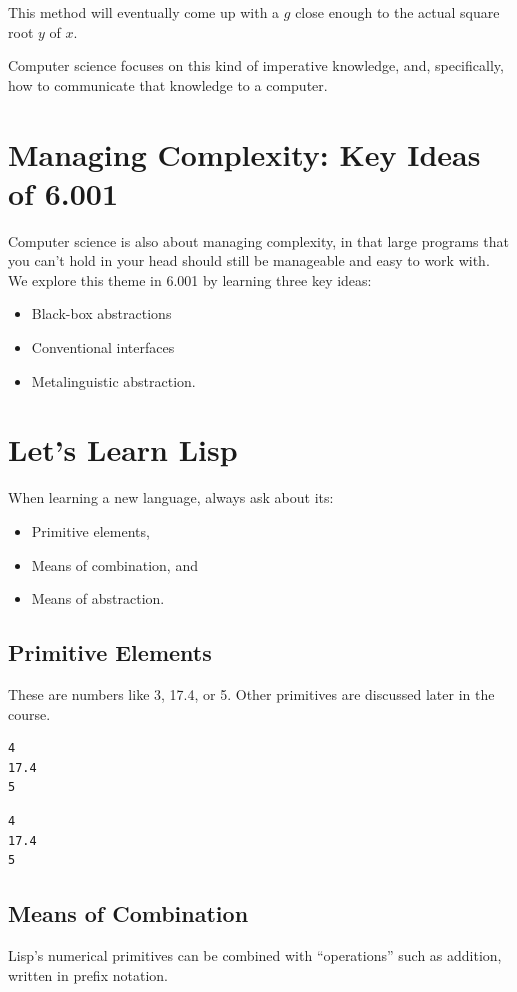\documentclass[9pt]{report}
\begin{document}
This method will eventually come up with a \(g\) close enough to the
actual square root \(y\) of \(x\).

Computer science focuses on this kind of imperative knowledge, and,
specifically, how to communicate that knowledge to a computer.

\section{Managing Complexity: Key Ideas of 6.001}
\label{sec:org9382d74}
Computer science is also about managing complexity, in that large
programs that you can't hold in your head should still be manageable
and easy to work with. We explore this theme in 6.001 by learning
three key ideas:

\begin{itemize}
\item Black-box abstractions
\item Conventional interfaces
\item Metalinguistic abstraction.
\end{itemize}


\section{Let's Learn Lisp}
\label{sec:orge65895a}
When learning a new language, always ask about its:
\begin{itemize}
\item Primitive elements,
\item Means of combination, and
\item Means of abstraction.
\end{itemize}

\subsection{Primitive Elements}
\label{sec:org0e97585}
These are numbers like 3, 17.4, or 5. Other primitives are
discussed later in the course.

\begin{verbatim}
4
17.4
5
\end{verbatim}

\begin{verbatim}
4
17.4
5
\end{verbatim}

\subsection{Means of Combination}
\label{sec:org91f1e09}
Lisp's numerical primitives can be combined with ``operations'' such
as addition, written in prefix notation.
\end{document}
